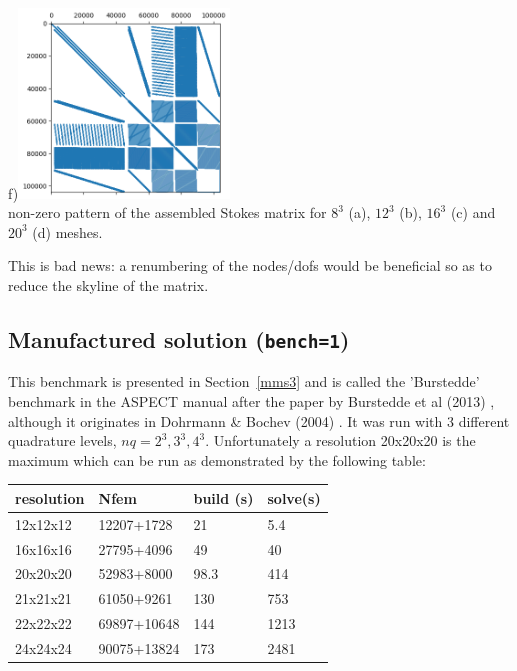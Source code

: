 \begin{center}
f)\includegraphics[width=5.6cm]{python_codes/fieldstone_81/results/matrix24}\\
{\captionfont non-zero pattern of the assembled Stokes matrix for $8^3$ (a), 
$12^3$ (b), $16^3$ (c) and $20^3$ (d) meshes.}
\end{center}
This is bad news: a renumbering of the nodes/dofs would be beneficial so as to reduce the 
skyline of the matrix. 

\subsection*{Manufactured solution ({\tt bench=1})}

This benchmark is presented in Section~\ref{mms3} and is called the 'Burstedde' benchmark in the ASPECT manual after 
the paper by Burstedde et al (2013) \cite{busa13}, although it originates in Dohrmann \& Bochev (2004) \cite{dobo04}. 
It was run with 3 different quadrature levels, $nq=2^3,3^3,4^3$. 
Unfortunately a resolution 20x20x20 is the maximum which can be run as demonstrated 
by the following table:

\begin{center}
\begin{tabular}{llll}
\hline
resolution &Nfem           &build (s) &solve(s) \\
\hline\hline
12x12x12   &12207+1728     &21        &5.4\\
16x16x16   &27795+4096     &49        &40\\
20x20x20   &52983+8000     &98.3      &414\\
21x21x21   &61050+9261     &130       &753 \\
22x22x22   &69897+10648    &144       &1213\\
24x24x24   &90075+13824    &173       &2481\\
\hline
\end{tabular}
\end{center}
 
